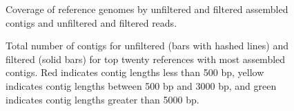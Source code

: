 \documentclass[11pt]{article} %
\begin{document}
\begin{landscape}
\begin{figure}[h!]
\caption{Coverage of reference genomes by unfiltered and filtered assembled contigs and unfiltered and filtered reads.}
\label{coverage2}
\end{figure}
\end{landscape}

\begin{landscape}
\begin{figure}[h!]
\caption{Total number of contigs for unfiltered (bars with hashed lines) and filtered (solid bars) for top twenty references with most assembled contigs.  Red indicates contig lengths less than 500 bp, yellow indicates contig lengths between 500 bp and 3000 bp, and green indicates contig lengths greater than 5000 bp.}
\label{contig-lengths}
\end{figure}
\end{landscape}
\end{document}
